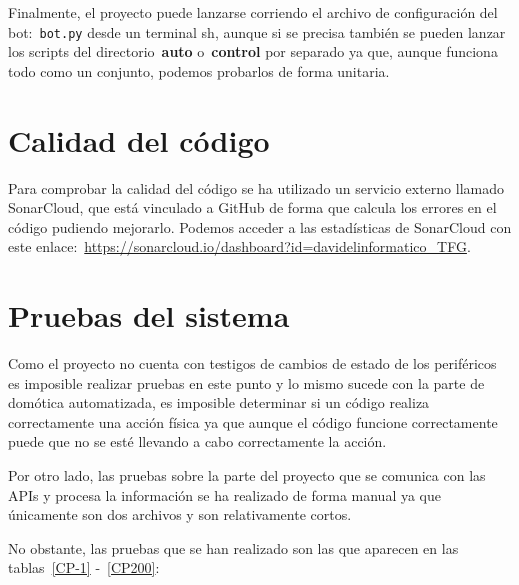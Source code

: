 Finalmente, el proyecto puede lanzarse corriendo el archivo de configuración del bot:~\texttt{bot.py} desde un terminal sh, aunque si se precisa también se pueden lanzar los scripts del directorio~\textbf{auto} o~\textbf{control} por separado ya que, aunque funciona todo como un conjunto, podemos probarlos de forma unitaria.


\section{Calidad del código}
Para comprobar la calidad del código se ha utilizado un servicio externo llamado SonarCloud, que está vinculado a GitHub de forma que calcula los errores en el código pudiendo mejorarlo.
Podemos acceder a las estadísticas de SonarCloud con este enlace:~\url{https://sonarcloud.io/dashboard?id=davidelinformatico_TFG}.


\section{Pruebas del sistema}
Como el proyecto no cuenta con testigos de cambios de estado de los periféricos es imposible realizar pruebas en este punto y lo mismo sucede con la parte de domótica automatizada, es imposible determinar si un código realiza correctamente una acción física ya que aunque el código funcione correctamente puede que no se esté llevando a cabo correctamente la acción.

Por otro lado, las pruebas sobre la parte del proyecto que se comunica con las APIs y procesa la información se ha realizado de forma manual ya que únicamente son dos archivos y son relativamente cortos. 


No obstante, las pruebas que se han realizado son las que aparecen en las tablas~\ref{CP-1} -~\ref{CP200}:

